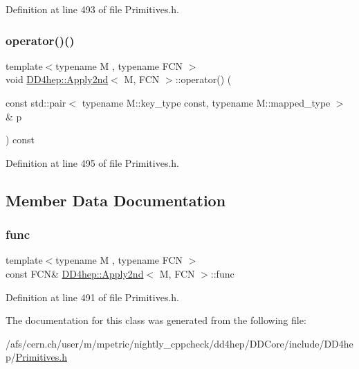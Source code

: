 Definition at line 493 of file Primitives.\+h.

\hypertarget{class_d_d4hep_1_1_apply2nd_ae08b4b0fb373ff5f933381219fe29902}{}\label{class_d_d4hep_1_1_apply2nd_ae08b4b0fb373ff5f933381219fe29902} 
\subsubsection{\texorpdfstring{operator()()}{operator()()}\hspace{0.1cm}{\footnotesize\ttfamily [2/2]}}
{\footnotesize\ttfamily template$<$typename M , typename F\+CN $>$ \\
void \hyperlink{class_d_d4hep_1_1_apply2nd}{D\+D4hep\+::\+Apply2nd}$<$ M, F\+CN $>$\+::operator() (\begin{DoxyParamCaption}\item[{const std\+::pair$<$ typename M\+::key\+\_\+type const, typename M\+::mapped\+\_\+type $>$ \&}]{p }\end{DoxyParamCaption}) const\hspace{0.3cm}{\ttfamily [inline]}}



Definition at line 495 of file Primitives.\+h.



\subsection{Member Data Documentation}
\hypertarget{class_d_d4hep_1_1_apply2nd_aa83e5fb456b913dfe4801fb585b073e0}{}\label{class_d_d4hep_1_1_apply2nd_aa83e5fb456b913dfe4801fb585b073e0} 
\subsubsection{\texorpdfstring{func}{func}}
{\footnotesize\ttfamily template$<$typename M , typename F\+CN $>$ \\
const F\+CN\& \hyperlink{class_d_d4hep_1_1_apply2nd}{D\+D4hep\+::\+Apply2nd}$<$ M, F\+CN $>$\+::func}



Definition at line 491 of file Primitives.\+h.



The documentation for this class was generated from the following file\+:\begin{DoxyCompactItemize}
\item 
/afs/cern.\+ch/user/m/mpetric/nightly\+\_\+cppcheck/dd4hep/\+D\+D\+Core/include/\+D\+D4hep/\hyperlink{_primitives_8h}{Primitives.\+h}\end{DoxyCompactItemize}
